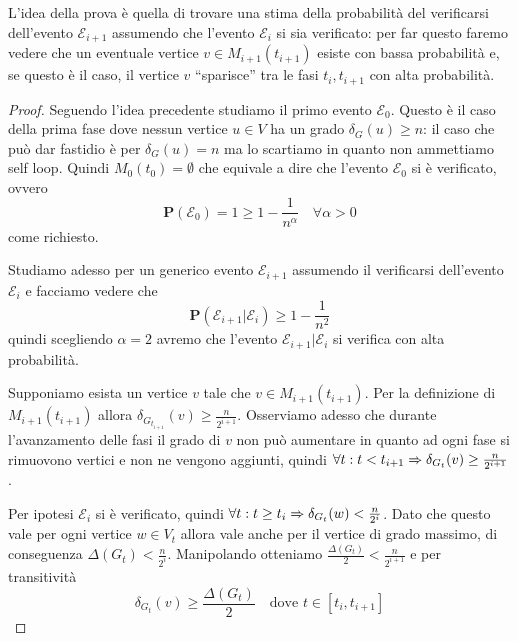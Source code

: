 \documentclass{article}
\begin{document}
    L'idea della prova \`e quella di trovare una stima della probabilit\`a 
    del verificarsi dell'evento $\mathcal{E}_{i+1}$ assumendo che l'evento 
    $\mathcal{E}_{i}$ si sia verificato: per far questo faremo vedere che
    un eventuale vertice $v \in M_{i+1}(t_{i+1})$ esiste con bassa
    probabilit\`a e, se questo \`e il caso, il vertice $v$ ``sparisce''
    tra le fasi $t_i, t_{i+1}$ con alta probabilit\`a.

\begin{proof}
    Seguendo l'idea precedente studiamo il primo evento $\mathcal{E}_0$. Questo 
    \`e il caso della prima fase dove nessun vertice $u \in V$ ha un grado 
    $\delta_G(u) \geq n$: il caso che pu\`o dar fastidio \`e per
    $\delta_G(u) = n$ ma lo scartiamo in quanto non ammettiamo self loop. 
    Quindi $M_0(t_0) = \emptyset$ che equivale a dire
    che l'evento $\mathcal{E}_0$ si \`e verificato, ovvero 
    \begin{displaymath}
        \mathbf{P} (\mathcal{E}_0) = 1 \geq 1 - \frac{1}{n^\alpha} \quad
        \forall \alpha > 0
    \end{displaymath}    
     come richiesto.

    Studiamo adesso per un generico evento $\mathcal{E}_{i+1}$ assumendo il
    verificarsi dell'evento $\mathcal{E}_{i}$ e facciamo vedere che
    \begin{displaymath}
        \mathbf{P}(\mathcal{E}_{i+1} | \mathcal{E}_{i}) \geq 1 - \frac{1}{n^2}
    \end{displaymath}
    quindi scegliendo $\alpha = 2$ avremo che l'evento 
    $\mathcal{E}_{i+1} | \mathcal{E}_{i}$ si verifica con alta probabilit\`a.

    Supponiamo esista un vertice $v$ tale che $v \in M_{i+1}(t_{i+1})$. Per
    la definizione di $M_{i+1}(t_{i+1})$ allora $\delta_{G_{t_{i+1}}}(v) 
    \geq \frac{n}{2^{i+1}}$. Osserviamo adesso che durante l'avanzamento delle
    fasi il grado di $v$ non pu\`o aumentare in quanto ad ogni fase si 
    rimuovono vertici e non ne vengono aggiunti, quindi $\forall t: 
    t < t_{i+1} \Rightarrow \delta_{G_{t}}(v) \geq \frac{n}{2^{i+1}}$.

    Per ipotesi $\mathcal{E}_i$ si \`e verificato, quindi $\forall t: 
    t \geq t_i \Rightarrow \delta_{G_{t}}(w) < \frac{n}{2^i}$.
    Dato che questo vale per ogni vertice $w \in V_t$ allora vale anche 
    per il vertice di grado massimo, di conseguenza 
    $\Delta(G_{t}) < \frac{n}{2^i}$. Manipolando otteniamo
    $\frac{\Delta(G_{t})}{2} < \frac{n}{2^{i+1}}$ e per transitivit\`a 
    \begin{displaymath}
        \delta_{G_t}(v) \geq \frac{\Delta(G_{t})}{2} \quad \text{dove } 
        t \in [t_i,t_{i+1}]
    \end{displaymath}


\end{proof}
\end{document}
